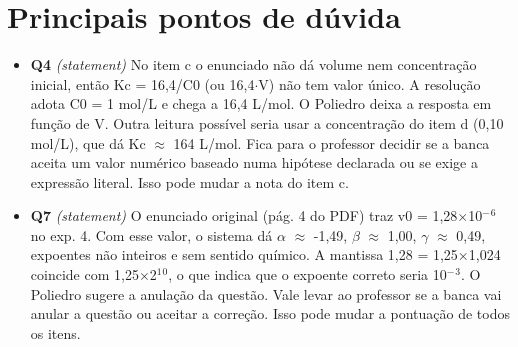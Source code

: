 \documentclass{article}%
\begin{document}
%
\section*{Principais pontos de dúvida}%
\begin{itemize}%
\item%
\textbf{Q4} \textit{(statement)} No item c o enunciado não dá volume nem concentração inicial, então Kc = 16,4/C0 (ou 16,4$\cdot$V) não tem valor único. A resolução adota C0 = 1 mol/L e chega a 16,4 L/mol. O Poliedro deixa a resposta em função de V. Outra leitura possível seria usar a concentração do item d (0,10 mol/L), que dá Kc $\approx$ 164 L/mol. Fica para o professor decidir se a banca aceita um valor numérico baseado numa hipótese declarada ou se exige a expressão literal. Isso pode mudar a nota do item c.%
\item%
\textbf{Q7} \textit{(statement)} O enunciado original (pág. 4 do PDF) traz v0 = 1,28$\times$10$^{-}$$^{6}$ no exp. 4. Com esse valor, o sistema dá $\alpha$ $\approx$ -1,49, $\beta$ $\approx$ 1,00, $\gamma$ $\approx$ 0,49, expoentes não inteiros e sem sentido químico. A mantissa 1,28 = 1,25$\times$1,024 coincide com 1,25$\times$2$^{1}$$^{0}$, o que indica que o expoente correto seria 10$^{-}$$^3$. O Poliedro sugere a anulação da questão. Vale levar ao professor se a banca vai anular a questão ou aceitar a correção. Isso pode mudar a pontuação de todos os itens.%
\end{itemize}%
\end{document}
